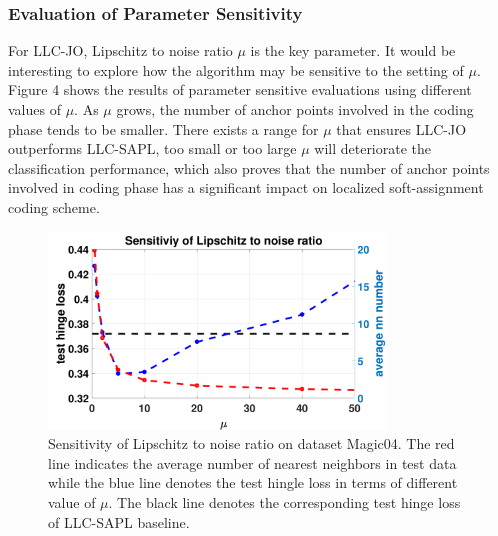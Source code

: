 \documentclass{llncs}
\begin{document}
	\subsubsection{Evaluation of Parameter Sensitivity}
	For LLC-JO, Lipschitz to noise ratio $\mu$ is the key parameter. It would be interesting to explore how the algorithm may be sensitive to the setting of $\mu$. Figure 4 shows the results of parameter sensitive evaluations using different values of $\mu$. As $\mu$ grows, the number of anchor points involved in the coding phase tends to be smaller. There exists a range for $\mu$ that ensures LLC-JO outperforms LLC-SAPL, too small or too large $\mu$ will deteriorate the classification performance, which also proves that the number of anchor points involved in coding phase has a significant impact on localized soft-assignment coding scheme.
	\begin{figure}[!tbp]
		\centering
		\includegraphics[width=0.8\textwidth]{magic04_mu.pdf}
		\caption{Sensitivity of Lipschitz to noise ratio on dataset Magic04. The red line indicates the average number of nearest neighbors in test data while the blue line denotes the test hingle loss in terms of different value of $\mu$. The black line denotes the corresponding test hinge loss of LLC-SAPL baseline.}
	\end{figure}
\end{document}
